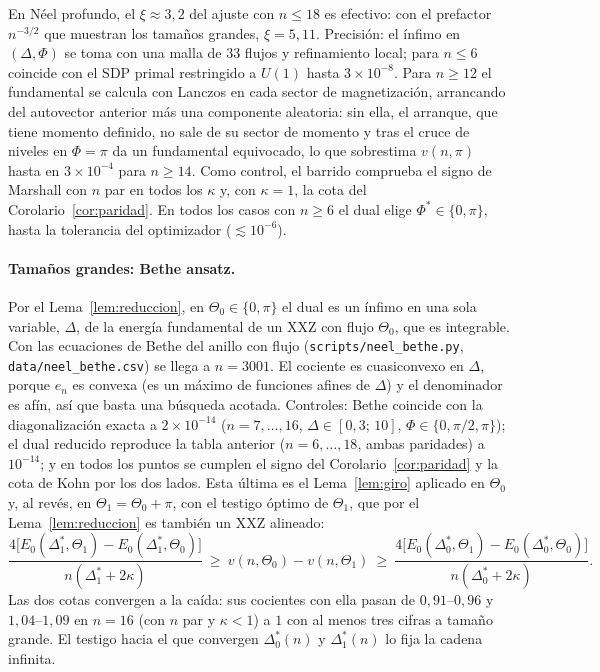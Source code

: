 \documentclass[11pt,a4paper]{article}
\theoremstyle{remark}
\begin{document}
En Néel profundo, el $\xi\approx3{,}2$ del ajuste con $n\le18$ es efectivo: con el prefactor
$n^{-3/2}$ que muestran los tamaños grandes, $\xi=5{,}11$.
Precisión: el ínfimo en $(\Delta,\Phi)$ se toma con una malla de 33 flujos y refinamiento local; para
$n\le6$ coincide con el SDP primal restringido a $U(1)$ hasta $3\times10^{-8}$. Para $n\ge12$ el
fundamental se calcula con Lanczos en cada sector de magnetización, arrancando del autovector
anterior más una componente aleatoria: sin ella, el arranque, que tiene momento definido, no sale
de su sector de momento y tras el cruce de niveles en $\Phi=\pi$ da un fundamental equivocado, lo
que sobrestima $v(n,\pi)$ hasta en $3\times10^{-4}$ para $n\ge14$.
Como control, el barrido comprueba el signo de Marshall con $n$ par en todos los $\kappa$ y, con
$\kappa=1$, la cota del Corolario~\ref{cor:paridad}. En todos los casos con $n\ge6$ el dual elige
$\Phi^\ast\in\{0,\pi\}$, hasta la tolerancia del optimizador ($\lesssim10^{-6}$).

\paragraph{Tamaños grandes: Bethe ansatz.} Por el Lema~\ref{lem:reduccion}, en $\Theta_0\in\{0,\pi\}$
el dual es un ínfimo en una sola variable, $\Delta$, de la energía fundamental de un XXZ con flujo
$\Theta_0$, que es integrable. Con las ecuaciones de Bethe del anillo con flujo
(\texttt{scripts/neel\_bethe.py}, \texttt{data/neel\_bethe.csv}) se llega a $n=3001$. El cociente
es cuasiconvexo en $\Delta$, porque $e_n$ es convexa (es un máximo de funciones afines de
$\Delta$) y el denominador es afín, así que basta una búsqueda acotada. Controles: Bethe coincide
con la diagonalización exacta a $2\times10^{-14}$ ($n=7,\dots,16$, $\Delta\in[0{,}3;\,10]$,
$\Phi\in\{0,\pi/2,\pi\}$); el dual reducido reproduce la tabla anterior ($n=6,\dots,18$, ambas
paridades) a $10^{-14}$; y en todos los puntos se cumplen el signo del Corolario~\ref{cor:paridad} y
la cota de Kohn por los dos lados. Esta última es el Lema~\ref{lem:giro} aplicado en $\Theta_0$ y,
al revés, en $\Theta_1=\Theta_0+\pi$, con el testigo óptimo de $\Theta_1$, que por el
Lema~\ref{lem:reduccion} es también un XXZ alineado:
\begin{equation}\label{eq:kohn2}
  \frac{4\big[E_0(\Delta^\ast_1,\Theta_1)-E_0(\Delta^\ast_1,\Theta_0)\big]}{n(\Delta^\ast_1+2\kappa)}\ \ge\
  v(n,\Theta_0)-v(n,\Theta_1)\ \ge\
  \frac{4\big[E_0(\Delta^\ast_0,\Theta_1)-E_0(\Delta^\ast_0,\Theta_0)\big]}{n(\Delta^\ast_0+2\kappa)} .
\end{equation}
Las dos cotas convergen a la caída: sus cocientes con ella pasan de $0{,}91$--$0{,}96$ y
$1{,}04$--$1{,}09$ en $n=16$ (con $n$ par y $\kappa<1$) a $1$ con al menos tres cifras a tamaño
grande. El testigo hacia el que
convergen $\Delta^\ast_0(n)$ y $\Delta^\ast_1(n)$ lo fija la cadena infinita.
\end{document}
